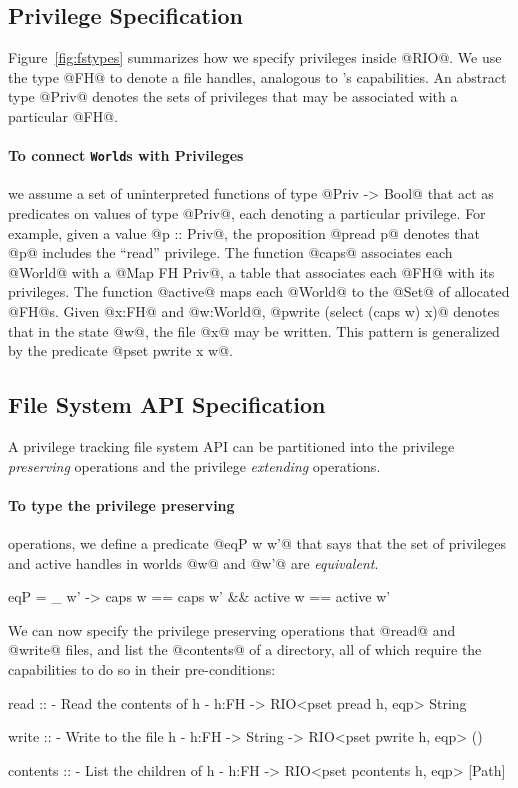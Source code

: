 \subsection{Privilege Specification}
\label{sec:privilege-spec}
%
Figure~\ref{fig:fstypes} summarizes how we specify privileges 
inside @RIO@. 
%
We use the type @FH@ to denote a file handles, analogous to \shill's
capabilities. An abstract type @Priv@ denotes the sets of privileges
that may be associated with a particular @FH@.

\paragraph{To connect \texttt{World}s with Privileges} we assume 
a set of uninterpreted functions of type @Priv ->  Bool@ 
that act as predicates on values of type @Priv@, each 
denoting a particular privilege.
%
For example, given a value @p :: Priv@, the proposition 
@pread p@ denotes that @p@ includes the ``read'' privilege.
%
The function @caps@ associates each @World@ with a @Map FH Priv@,
a table that associates each @FH@ with its privileges.
% 
The function @active@ maps each @World@ to the @Set@ of
allocated @FH@s.
%
Given @x:FH@ and @w:World@, @pwrite (select (caps w) x)@
denotes that in the state @w@, the file @x@ 
may be written.
%
This pattern is generalized by the predicate @pset pwrite x w@.

\subsection{File System API Specification}
\label{sec:fs-api}
%
A privilege tracking file system API can be partitioned into the
privilege \emph{preserving} operations and the privilege \emph{extending}
operations.

\paragraph{To type the privilege preserving} operations, we define a predicate
@eqP w w'@ that says that the set of privileges and active handles
in worlds @w@ and @w'@ are \emph{equivalent}.
%
\begin{code}
  eqP = \w _ w' -> 
    caps w == caps w' && active w == active w'
\end{code}
%
We can now specify the privilege preserving operations that @read@ and @write@ files, 
and list the @contents@ of a directory, all of which require the 
capabilities to do so in their pre-conditions:
%
\begin{code}
  read :: {- Read the contents of h -}
    h:FH -> RIO<pset pread h, eqp> String
  
  write :: {- Write to the file h -}
    h:FH -> String -> RIO<pset pwrite h, eqp> ()
  
  contents :: {- List the children of h -}
    h:FH -> RIO<pset pcontents h, eqp> [Path]
\end{code} 

